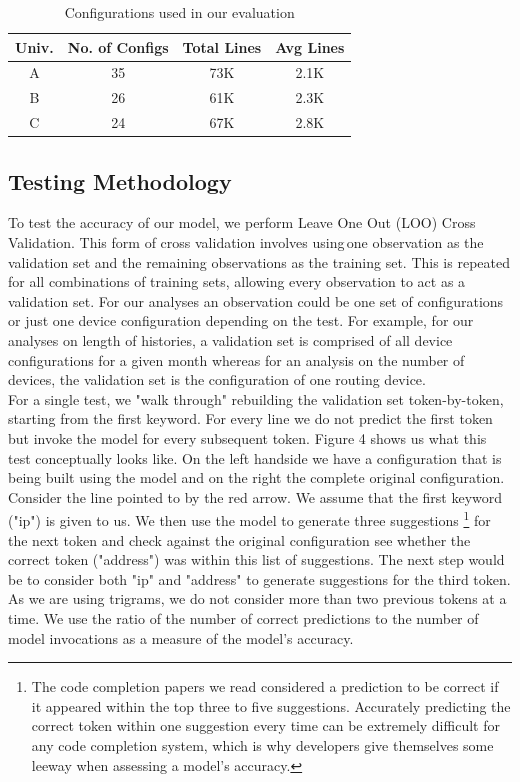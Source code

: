 \begin{table}
    \small \centering
    \begin{tabular}{ | c | c | c | c |}
    \hline
        {\bf Univ.} & {\bf No. of Configs} & {\bf Total Lines} & {\bf Avg
    Lines} \\ 
    \hline
    A & 35 & 73K & 2.1K \\ 
    B & 26 & 61K & 2.3K \\ 
    C & 24 & 67K & 2.8K \\ 
    \hline
    \end{tabular}
    \caption{Configurations used in our evaluation}
    \vspace{-1em}
    \label{tab:datasets}
\end{table}


\subsection{Testing Methodology}

To test the accuracy of our model, we perform Leave One Out (LOO) Cross Validation. This form of cross validation involves using one observation as the validation set and the remaining observations as the training set. This is repeated for all combinations of training sets, allowing every observation to act as a validation set. For our analyses an observation could be one set of configurations or just one device configuration depending on the test. For example, for our analyses on length of histories, a validation set is comprised of all device configurations for a given month whereas for an analysis on the number of devices, the validation set is the configuration of one routing device.\\

For a single test, we "walk through" rebuilding the validation set token-by-token, starting from the first keyword. For every line we do not predict the first token but invoke the model for every subsequent token. Figure 4 shows us what this test conceptually looks like. On the left handside we have a configuration that is being built using the model and on the right the complete original configuration. Consider the line pointed to by the red arrow. We assume that the first keyword ("ip") is given to us. We then use the model to generate three suggestions
\footnote{The code completion papers we read considered a prediction to be correct if it appeared within the top three to five suggestions. Accurately predicting the correct token within one suggestion every time can be extremely difficult for any code completion system, which is why developers give themselves some leeway when assessing a model's accuracy.}
for the next token and check against the original configuration see whether the correct token ("address") was within this list of suggestions. The next step would be to consider both "ip" and "address" to generate suggestions for the third token. As we are using trigrams, we do not consider more than two previous tokens at a time. We use the ratio of the number of correct predictions to the number of model invocations as a measure of the model's accuracy.\\

